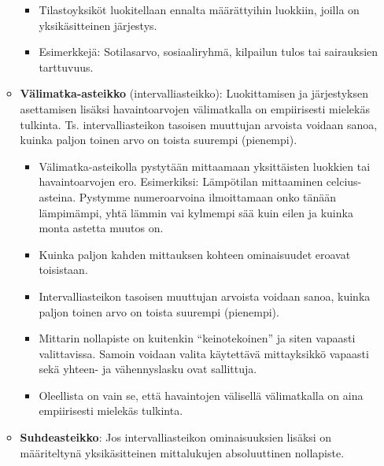 \documentclass[
]{book}
\providecommand{\tightlist}{%
  \setlength{\itemsep}{0pt}\setlength{\parskip}{0pt}}
\begin{document}
\begin{itemize}
\begin{itemize}
    \begin{itemize}
    \tightlist
    \item
      Tilastoyksiköt luokitellaan ennalta määrättyihin luokkiin, joilla on yksikäsitteinen järjestys.
    \item
      Esimerkkejä: Sotilasarvo, sosiaaliryhmä, kilpailun tulos tai sairauksien tarttuvuus.
    \end{itemize}
  \item
    \textbf{Välimatka-asteikko} (intervalliasteikko): Luokittamisen ja järjestyksen asettamisen lisäksi havaintoarvojen välimatkalla on empiirisesti mielekäs tulkinta. Ts. intervalliasteikon tasoisen muuttujan arvoista voidaan sanoa, kuinka paljon toinen arvo on toista suurempi (pienempi).

    \begin{itemize}
    \tightlist
    \item
      Välimatka-asteikolla pystytään mittaamaan yksittäisten luokkien tai havaintoarvojen ero. Esimerkiksi: Lämpötilan mittaaminen celcius-asteina. Pystymme numeroarvoina ilmoittamaan onko tänään lämpimämpi, yhtä lämmin vai kylmempi sää kuin eilen ja kuinka monta astetta muutos on.
    \item
      Kuinka paljon kahden mittauksen kohteen ominaisuudet eroavat toisistaan.
    \item
      Intervalliasteikon tasoisen muuttujan arvoista voidaan sanoa, kuinka paljon toinen arvo on toista suurempi (pienempi).
    \item
      Mittarin nollapiste on kuitenkin ``keinotekoinen'' ja siten vapaasti valittavissa. Samoin voidaan valita käytettävä mittayksikkö vapaasti sekä yhteen- ja vähennyslasku ovat sallittuja.
    \item
      Oleellista on vain se, että havaintojen välisellä välimatkalla on aina empiirisesti mielekäs tulkinta.
    \end{itemize}
  \item
    \textbf{Suhdeasteikko}: Jos intervalliasteikon ominaisuuksien lisäksi on määriteltynä yksikäsitteinen mittalukujen absoluuttinen nollapiste.


\end{itemize}
\end{itemize}
\end{document}
